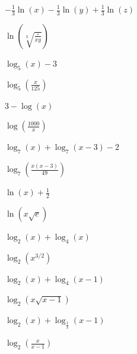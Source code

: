 \documentclass{ximera}
\begin{document}
\begin{question}
\begin{problem}
     $-\frac{1}{3} \ln(x) - \frac{1}{3}\ln(y) + \frac{1}{3} \ln(z)$

     \begin{solution}
         $\ln\left(\sqrt[3]{\frac{z}{xy}}   \right)$
     \end{solution}
\end{problem}

\begin{problem}
    $\log_{5}(x) - 3$

\begin{solution}
$\log_{5}\left(\frac{x}{125}\right)$
\end{solution}
\end{problem}

\begin{problem}
    $3 - \log(x)$

    \begin{solution}
        $\log\left(\frac{1000}{x}\right)$
    \end{solution}
\end{problem}

\begin{problem}
     $\log_{7}(x) + \log_{7}(x - 3) - 2$

\begin{solution}
$\log_{7}\left(\frac{x(x - 3)}{49}\right)$
\end{solution}
\end{problem}

\begin{problem}
    $\ln(x) + \frac{1}{2}$ 

    \begin{solution}
        $\ln \left(x \sqrt{e} \right)$
    \end{solution}
\end{problem}

\begin{problem}
    $\log_{2}(x) + \log_{4}(x)$

\begin{solution}
$\log_{2}\left(x^{3/2}\right)$
\end{solution}
\end{problem}

\begin{problem}
    $\log_{2}(x) + \log_{4}(x-1)$

    \begin{solution}
        $\log_{2}\left(x \sqrt{x-1}\right)$
    \end{solution}
\end{problem}

\begin{problem}\label{combineloglast}
    $\log_{2}(x) + \log_{\frac{1}{2}}(x - 1)$ 

\begin{solution}
$\log_{2}\left(\frac{x}{x - 1}\right)$
\end{solution}
\end{problem}

\end{question}
\end{document}
